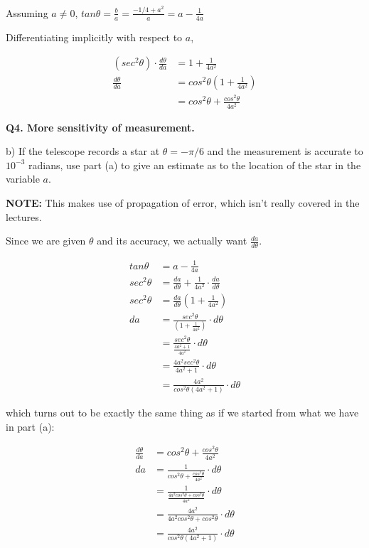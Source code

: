 \documentclass[9pt]{article}
\begin{document}
Assuming $a \neq 0$, $tan \theta = \frac{b}{a} = \frac{-1/4 + a^2}{a} = a - \frac{1}{4a}$

Differentiating implicitly with respect to $a$,

\begin{align*}
  (sec^2 \theta) \cdot \frac{d \theta}{da} &= 1 + \frac{1}{4a^2} \\
  \frac{d \theta}{da} &= cos^2 \theta (1 + \frac{1}{4a^2}) \\
                      &= cos^2 \theta + \frac{cos^2 \theta}{4a^2}
\end{align*}

\begin{tcolorbox}
  \textbf{Q4. More sensitivity of measurement.}

  b) If the telescope records a star at $\theta = -\pi / 6$ and the measurement is accurate to $10^{-3}$ radians, use part (a) to give an estimate as to the location of the star in the variable $a$.
\end{tcolorbox}

\textbf{NOTE:} This makes use of propagation of error, which isn't really covered in the lectures.

Since we are given $\theta$ and its accuracy, we actually want $\frac{da}{d \theta}$.

\begin{align*}
  tan \theta &= a - \frac{1}{4a} \\
  sec^2 \theta &= \frac{da}{d \theta} + \frac{1}{4a^2} \cdot \frac{da}{d \theta} \\
  sec^2 \theta &= \frac{da}{d \theta} (1 + \frac{1}{4a^2}) \\
  da &= \frac{sec^2 \theta}{(1 + \frac{1}{4a^2})} \cdot d \theta \\
     &= \frac{sec^2 \theta}{\frac{4a^2 + 1}{4a^2}} \cdot d \theta \\
     &= \frac{4a^2 sec^2 \theta}{4a^2 + 1} \cdot d \theta \\
     &= \frac{4a^2}{cos^2 \theta (4a^2 + 1)} \cdot d \theta
\end{align*}

which turns out to be exactly the same thing as if we started from what we have in part (a):

\begin{align*}
  \frac{d \theta}{da} &= cos^2 \theta + \frac{cos^2 \theta}{4a^2} \\
  da &= \frac{1}{cos^2 \theta + \frac{cos^2 \theta}{4a^2}} \cdot d \theta \\
     &= \frac{1}{\frac{4a^2 cos^2 \theta + cos^2 \theta}{4a^2}} \cdot d \theta \\
     &= \frac{4a^2}{4a^2 cos^2 \theta + cos^2 \theta} \cdot d \theta \\
     &= \frac{4a^2}{cos^2 \theta (4a^2 + 1)} \cdot d \theta
\end{align*}
\end{document}
